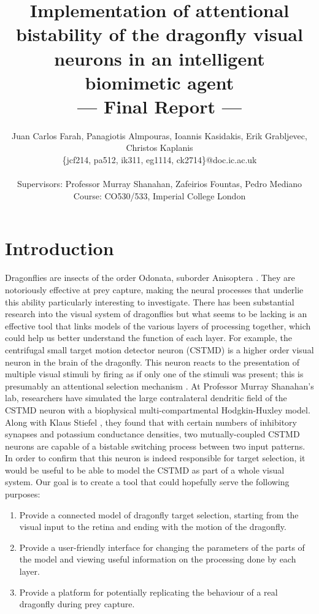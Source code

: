 \documentclass[a4paper,11pt]{article}
\title{Implementation of attentional bistability of the dragonfly visual neurons in an intelligent biomimetic agent\\\Large{--- Final Report ---}}
\author{Juan Carlos Farah, Panagiotis Almpouras, Ioannis Kasidakis, Erik Grabljevec, Christos Kaplanis\\
       \{jcf214, pa512, ik311, eg1114, ck2714\}@doc.ic.ac.uk\\ \\
       \small{Supervisors: Professor Murray Shanahan, Zafeirios Fountas, Pedro Mediano}\\
       \small{Course: CO530/533, Imperial College London}
}
\begin{document}
\maketitle

\section{Introduction}

Dragonflies are insects of the order Odonata, suborder Anisoptera \cite{dfwiki}. They are notoriously effective at prey capture, making the neural processes that underlie this ability particularly interesting to investigate. There has been substantial research into the visual system of dragonflies but what seems to be lacking is an effective tool that links models of the various layers of processing together, which could help us better understand the function of each layer. For example, the centrifugal small target motion detector neuron (CSTMD) is a higher order visual neuron in the brain of the dragonfly. This neuron reacts to the presentation of multiple visual stimuli by firing as if only one of the stimuli was present; this is presumably an attentional selection mechanism \cite{w13}. At Professor Murray Shanahan's lab, researchers have simulated the large contralateral dendritic field of the CSTMD neuron with a biophysical multi-compartmental Hodgkin-Huxley model. Along with Klaus Stiefel \cite{ne13}, they found that with certain numbers of inhibitory synapses and potassium conductance densities, two mutually-coupled CSTMD neurons are capable of a bistable switching process between two input patterns. In order to confirm that this neuron is indeed responsible for target selection, it would be useful to be able to model the CSTMD as part of a whole visual system. Our goal is to create a tool that could hopefully serve the following purposes:
\begin{enumerate}
\item Provide a connected model of dragonfly target selection, starting from the visual input to the retina and ending with the motion of the dragonfly.
\item Provide a user-friendly interface for changing the parameters of the parts of the model and viewing useful information on the processing done by each layer.
\item Provide a platform for potentially replicating the behaviour of a real dragonfly during prey capture.
\end{enumerate}
\end{document}
